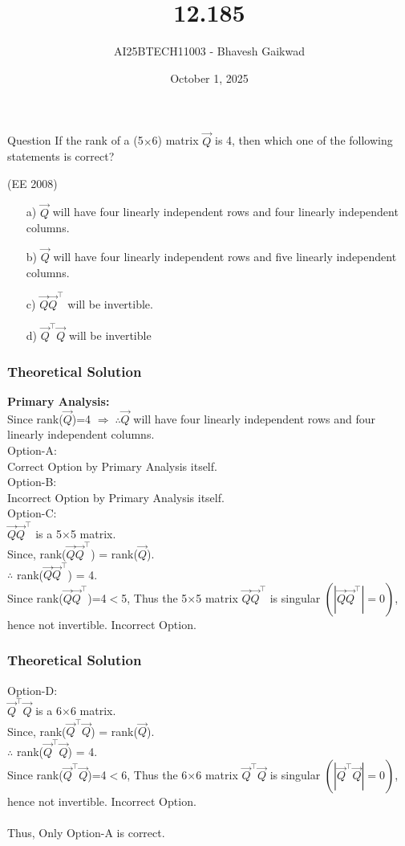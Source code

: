\documentclass{beamer}
\title
{12.185}
\date{October 1, 2025}
\author 
{AI25BTECH11003 - Bhavesh Gaikwad}
\begin{document}
\frame{\titlepage}
\begin{frame}{Question}
If the rank of a (5$\times$6) matrix $\vec{Q}$ is 4, then which one of the following statements is correct?

\hfill{(EE 2008)}

\begin{itemize}
    \item[a)]$\vec{Q}$ will have four linearly independent rows and four linearly independent columns.
    \item[b)]$\vec{Q}$ will have four linearly independent rows and five linearly independent columns.
    \item[c)]$\vec{Q}\vec{Q}^\top$ will be invertible.
    \item[d)]$\vec{Q}^\top\vec{Q}$ will be invertible 
\end{itemize}

\end{frame}


\begin{frame}[fragile]
    \frametitle{Theoretical Solution}
\textbf{Primary Analysis:}\\
Since rank($\vec{Q}$)=4 $\Rightarrow \; \therefore \vec{Q}$ will have four linearly independent rows and four linearly independent columns.\\

Option-A:\\
Correct Option by Primary Analysis itself.\\

Option-B:\\
Incorrect Option by Primary Analysis itself.\\

Option-C:\\
$\vec{Q}\vec{Q}^\top$ is a 5$\times$5 matrix.\\
Since, rank($\vec{Q}\vec{Q}^\top$) = rank($\vec{Q}$).\\
$\therefore$ rank($\vec{Q}\vec{Q}^\top$) = 4.\\
Since rank($\vec{Q}\vec{Q}^\top$)=4$<$5, Thus the 5$\times$5 matrix $\vec{Q}\vec{Q}^\top$ is singular $\left(|\vec{Q}\vec{Q}^\top|=0\right)$, hence not invertible.
\bigskip
Incorrect Option.\\
\end{frame}



\begin{frame}[fragile]
    \frametitle{Theoretical Solution}
Option-D:\\
$\vec{Q}^\top\vec{Q}$ is a 6$\times$6 matrix.\\
Since, rank($\vec{Q}^\top\vec{Q}$) = rank($\vec{Q}$).\\
$\therefore$ rank($\vec{Q}^\top\vec{Q}$) = 4.\\
Since rank($\vec{Q}^\top\vec{Q}$)=4$<$6, Thus the 6$\times$6 matrix $\vec{Q}^\top\vec{Q}$ is singular $\left(|\vec{Q}^\top\vec{Q}|=0\right)$, hence not invertible.
\bigskip
Incorrect Option.\\\\

Thus, Only Option-A is correct.
\end{frame}
\end{document}
